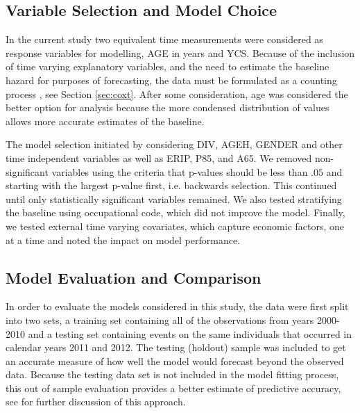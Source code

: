 \documentclass[12pt,letterpaper]{article}
\begin{document}
\subsection{Variable Selection and Model Choice} \label{sec:modelchoice}
In the current study two equivalent time measurements were considered as response variables for modelling, AGE in years and YCS.  Because of the inclusion of time varying explanatory variables, and the need to estimate the baseline hazard for purposes of forecasting, the data must be formulated as a counting process , see Section \ref{sec:coxt}. After some consideration, age was considered the better option for analysis because the more condensed distribution of values allows more accurate estimates of the baseline.

The model selection initiated by considering DIV, AGEH, GENDER and other time independent variables as well as ERIP, P85, and A65. We removed non-significant variables using the criteria that p-values should be less than $.05$ and starting with the largest p-value first, i.e. backwards selection.  This continued until only statistically significant variables remained.  We also tested stratifying the baseline using occupational code, which did not improve the model. Finally, we tested external time varying covariates, which capture economic factors, one at a time and noted the impact on model performance.


\subsection{Model Evaluation and Comparison}

In order to evaluate the models considered in this study, the data were first split into two sets, a training set containing all of the observations from years 2000-2010 and a testing set containing events on the same individuals that occurred in calendar years 2011 and 2012. The testing (holdout) sample was included to get an accurate measure of how well the model would forecast beyond the observed data.  Because the testing data set is not included in the model fitting process, this out of sample evaluation provides a better estimate of predictive accuracy, see \citet{kuhn2013} for further discussion of this approach.
\end{document}
